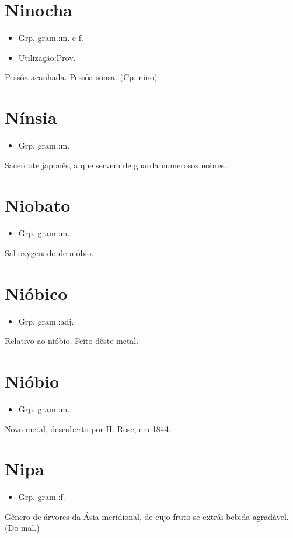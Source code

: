 \section{Ninocha}
\begin{itemize}
\item {Grp. gram.:m.  e  f.}
\end{itemize}
\begin{itemize}
\item {Utilização:Prov.}
\end{itemize}
Pessôa acanhada.
Pessôa sonsa.
(Cp. \textunderscore nino\textunderscore )
\section{Nínsia}
\begin{itemize}
\item {Grp. gram.:m.}
\end{itemize}
Sacerdote japonês, a que servem de guarda numerosos nobres.
\section{Niobato}
\begin{itemize}
\item {Grp. gram.:m.}
\end{itemize}
Sal oxygenado de nióbio.
\section{Nióbico}
\begin{itemize}
\item {Grp. gram.:adj.}
\end{itemize}
Relativo ao nióbio.
Feito dêste metal.
\section{Nióbio}
\begin{itemize}
\item {Grp. gram.:m.}
\end{itemize}
Novo metal, descoberto por H. Rose, em 1844.
\section{Nipa}
\begin{itemize}
\item {Grp. gram.:f.}
\end{itemize}
Gênero de árvores da Ásia meridional, de cujo fruto se extrái bebida agradável.
(Do mal.)
